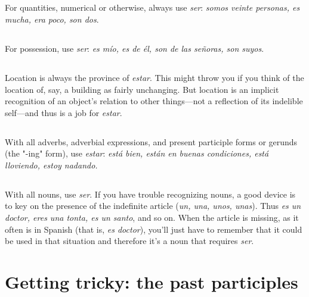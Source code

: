 \documentclass[14pt,a4paper,oneside]{memoir}
\begin{document}
\subsection{}

For quantities, numerical or otherwise, always use \emph{ser}: \emph{somos veinte personas, es mucha, era poco, son dos}.

\subsection{}

For possession, use \emph{ser}: \emph{es mío, es de él, son de las señoras,
son suyos}.

\subsection{}

Location is always the province of \emph{estar}. This might throw
you if you think of the location of, say, a building as fairly unchanging.
But location is an implicit recognition of an object's relation to other
things---not a reflection of its indelible self---and thus is a job for
\emph{estar}.

\subsection{}

With all adverbs, adverbial expressions, and present participle forms or gerunds (the "-ing" form), use \emph{estar}: \emph{está bien, están en
buenas condiciones, está lloviendo, estoy nadando.}

\subsection{}

With all nouns, use \emph{ser}. If you have trouble recognizing
nouns, a good device is to key on the presence of the indefinite article
(\emph{un, una, unos, unas}). Thus \emph{es un doctor, eres una tonta, es un santo},
and so on. When the article is missing, as it often is in Spanish (that is,
\emph{es doctor}), you'll just have to remember that it could be used in that
situation and therefore it's a noun that requires \emph{ser}.

\section{Getting tricky: the past participles}
\end{document}
